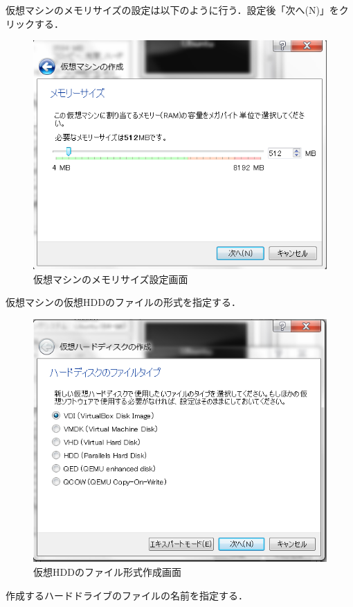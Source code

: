 仮想マシンのメモリサイズの設定は以下のように行う．設定後「次へ(N)」をクリックする．

\begin{figure}[htb]
\centering
\includegraphics[width=15cm]{vb2.png}
\caption{仮想マシンのメモリサイズ設定画面}\label{仮想マシンの設定画面}
\end{figure}
\clearpage
仮想マシンの仮想HDDのファイルの形式を指定する．


\begin{figure}[htb]
\centering
\includegraphics[width=15cm]{vb3.png}
\caption{仮想HDDのファイル形式作成画面}\label{仮想マシンの設定画面}
\end{figure}
\clearpage
作成するハードドライブのファイルの名前を指定する．




